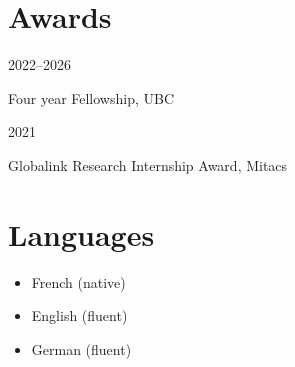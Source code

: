 \documentclass[10pt,a4paper]{article}
\newcommand{\entry}[2]{%
  \noindent\parbox[t]{3cm}{\raggedright\strut #1}%
  \parbox[t]{\dimexpr\linewidth-3cm}{#2}\par\vspace{0.35em}}
\begin{document}
\section{Awards}
\entry{2022--2026}{Four year Fellowship, UBC}
\entry{2021}{Globalink Research Internship Award, Mitacs }



\section{Languages}
\begin{itemize}[leftmargin=1.2em, itemsep=0.1em, topsep=0pt]
    \item French (native)
    \item English (fluent)
    \item German (fluent)
\end{itemize}
\end{document}
